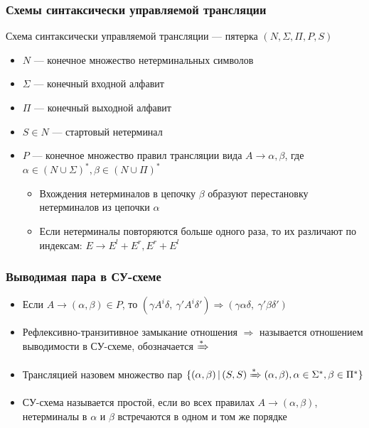 \documentclass{beamer}
\newcommand{\derive}[0]{\xRightarrow[]{*}}
\begin{document}
\begin{frame}[fragile]
  \transwipe[direction=90]
  \frametitle{Схемы синтаксически управляемой трансляции}

\begin{center}
    Схема синтаксически управляемой трансляции --- пятерка $(N, \Sigma, \Pi, P, S)$ 
\end{center} 

  \begin{itemize}
    \item $N$ --- конечное множество нетерминальных символов
    \item $\Sigma$ --- конечный входной алфавит 
    \item $\Pi$ --- конечный выходной алфавит
    \item $S \in N$ --- стартовый нетерминал
    \item $P$ --- конечное множество правил трансляции вида $A \rightarrow \alpha, \beta$, где $\alpha \in (N \cup \Sigma)^*, \beta \in (N \cup \Pi)^*$
    \begin{itemize}
      \item Вхождения нетерминалов в цепочку $\beta$ образуют перестановку нетерминалов из цепочки $\alpha$
      \item Если нетерминалы повторяются больше одного раза, то их различают по индексам: $E \rightarrow E^l + E^r, E^r + E^l$
    \end{itemize}
  \end{itemize}
\end{frame}

\begin{frame}[fragile]
  \transwipe[direction=90]
  \frametitle{Выводимая пара в СУ-схеме}
  \begin{itemize}
    \item Если $A \rightarrow (\alpha, \beta) \in P$, то $(\gamma A^i \delta, \ \gamma' A^i \delta') \Rightarrow (\gamma \alpha \delta, \ \gamma' \beta \delta')$
    \item Рефлексивно-транзитивное замыкание отношения $\Rightarrow$ называется отношением выводимости в СУ-схеме, обозначается $\xRightarrow[]{*}$
    \item Трансляцией назовем множество пар $\{ (\alpha, \beta) \, | \, (S, S) \derive (\alpha, \beta), \alpha \in \Sigma^*, \beta \in \Pi^* \}$
    \item СУ-схема называется простой, если во всех правилах $A \rightarrow (\alpha, \beta)$, нетерминалы в $\alpha$ и $\beta$ встречаются в одном и том же порядке
  \end{itemize}
\end{frame}
\end{document}
